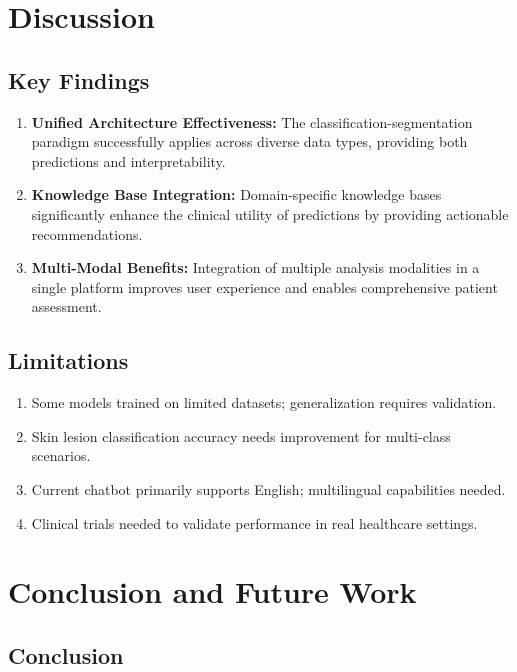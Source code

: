 \documentclass[conference]{IEEEtran}
\begin{document}
\section{Discussion}

\subsection{Key Findings}

\begin{enumerate}
\item \textbf{Unified Architecture Effectiveness:} The classification-segmentation paradigm successfully applies across diverse data types, providing both predictions and interpretability.

\item \textbf{Knowledge Base Integration:} Domain-specific knowledge bases significantly enhance the clinical utility of predictions by providing actionable recommendations.

\item \textbf{Multi-Modal Benefits:} Integration of multiple analysis modalities in a single platform improves user experience and enables comprehensive patient assessment.
\end{enumerate}

\subsection{Limitations}

\begin{enumerate}
\item Some models trained on limited datasets; generalization requires validation.
\item Skin lesion classification accuracy needs improvement for multi-class scenarios.
\item Current chatbot primarily supports English; multilingual capabilities needed.
\item Clinical trials needed to validate performance in real healthcare settings.
\end{enumerate}

\section{Conclusion and Future Work}

\subsection{Conclusion}
\end{document}
